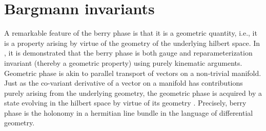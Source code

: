 \section{Bargmann invariants}
A remarkable feature of the berry phase is that it is a geometric quantity, i.e., it is a property arising by virtue of the geometry of the 
underlying hilbert space. In \parencite{mukunda1993quantum}, it is demonstrated that the berry phase is both gauge and reparameterization 
invariant (thereby a geometric property) using purely kinematic arguments. Geometric phase is akin to parallel transport of vectors on a 
non-trivial manifold. Just as the co-variant derivative of a vector on a manifold has contributions purely arising from the underlying 
geometry, the geometric phase is acquired by a state evolving in the hilbert space by virtue of its geometry \cite{simon1983holonomy}. 
Precisely, berry phase is the holonomy in a hermitian line bundle in the language of differential geometry.

